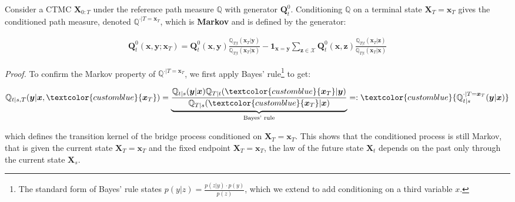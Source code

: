 \documentclass{article}
\newcommand{\bluetext}[1]{\textcolor{customblue}{#1}}
\begin{document}
\begin{lemma}\label{lemma:ctmc-cond-generator-markov}
    Consider a CTMC $\boldsymbol{X}_{0:T}$ under the reference path measure $\mathbb{Q}$ with generator $\boldsymbol{Q}^0_t$. Conditioning $\mathbb{Q}$ on a terminal state $\boldsymbol{X}_T=\boldsymbol{x}_T$ gives the conditioned path measure, denoted $\mathbb{Q}^{\cdot|T=\boldsymbol{x}_T}$, which is \textbf{Markov} and is defined by the generator:
    \begin{small}
    \begin{align}
        \boldsymbol{Q}^0_t(\boldsymbol{x},\boldsymbol{y}; \boldsymbol{x}_T)=\boldsymbol{Q}^0_t(\boldsymbol{x},\boldsymbol{y})\frac{\mathbb{Q}_{T|t}(\boldsymbol{x}_T|\boldsymbol{y})}{\mathbb{Q}_{T|t}(\boldsymbol{x}_T|\boldsymbol{x})}-\boldsymbol{1}_{\boldsymbol{x}=\boldsymbol{y}}\sum_{\boldsymbol{z}\in \mathcal{X}}\boldsymbol{Q}^0_t(\boldsymbol{x}, \boldsymbol{z})\frac{\mathbb{Q}_{T|t}( \boldsymbol{x}_T|\boldsymbol{z})}{\mathbb{Q}_{T|t}(\boldsymbol{x}_T|\boldsymbol{x})}
    \end{align}
    \end{small}
\end{lemma}
\textit{Proof.} To confirm the Markov property of $\mathbb{Q}^{\cdot|T=\boldsymbol{x}_T}$, we first apply Bayes' rule\footnote{The standard form of Bayes' rule states $p(y|z) =\frac{p(z|y) \cdot p(y)}{p(z)}$, which we extend to add conditioning on a third variable $x$.} to get:
\begin{small}
\begin{align}
    \mathbb{Q}_{t|s,T}(\boldsymbol{y}|\boldsymbol{x}, \bluetext{\boldsymbol{x}_T})=\underbrace{\frac{\mathbb{Q}_{t|s}(\boldsymbol{y}|\boldsymbol{x})\mathbb{Q}_{T|t}(\bluetext{\boldsymbol{x}_T}|\boldsymbol{y})}{\mathbb{Q}_{T|s}(\bluetext{\boldsymbol{x}_T}|\boldsymbol{x})}}_{\text{Bayes' rule}}=:\bluetext{\mathbb{Q}^{\cdot|T=\boldsymbol{x}_T}_{t|s}(\boldsymbol{y}|\boldsymbol{x})}\label{eq:ctmc-endpoint-cond-prob}
\end{align}
\end{small}
which defines the transition kernel of the bridge process conditioned on $\boldsymbol{X}_T=\boldsymbol{x}_T$. This shows that the conditioned process is still Markov, that is given the current state $\boldsymbol{X}_T=\boldsymbol{x}_T$ and the fixed endpoint $\boldsymbol{X}_T=\boldsymbol{x}_T$, the law of the future state $\boldsymbol{X}_t$ depends on the past only through the current state $\boldsymbol{X}_s$.
\end{document}
